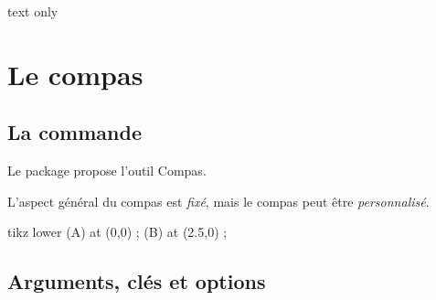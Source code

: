 \documentclass[french,a4paper,11pt]{article}
\newcommand\affichegrille[4]{%
	\draw[xstep=1,ystep=1,lightgray] (#1,#3) grid (#2,#4) ;
	\foreach \x in {#1,\inteval{1+#1},...,#2} \draw[lightgray] (\x,#4)--++(0,3pt) node[font=\scriptsize,above] {$\x$} ;
	\foreach \y in {#3,\inteval{1+#3},...,#4} \draw[lightgray] (#1,\y)--++(-3pt,0) node[font=\scriptsize,left] {$\y$} ;
}
\newcommand\pointsutiles[1]{%
	\foreach \point in {#1} {\draw[thick,fill=red] \point circle[radius=3pt] ;}
}
\begin{document}
\begin{PresentationCode}{text only}
\end{PresentationCode}

\pagebreak

\section{Le compas}

\subsection{La commande}

\begin{cautionblock}
Le package propose l'outil \textsf{Compas}.

L'aspect général du compas est \textit{fixé}, mais le compas peut être \textit{personnalisé}.
\end{cautionblock}

\begin{PresentationCode}{tikz lower}
\coordinate (A) at (0,0) ;
\coordinate (B) at (2.5,0) ;
\end{PresentationCode}

\subsection{Arguments, clés et options}
\end{document}
